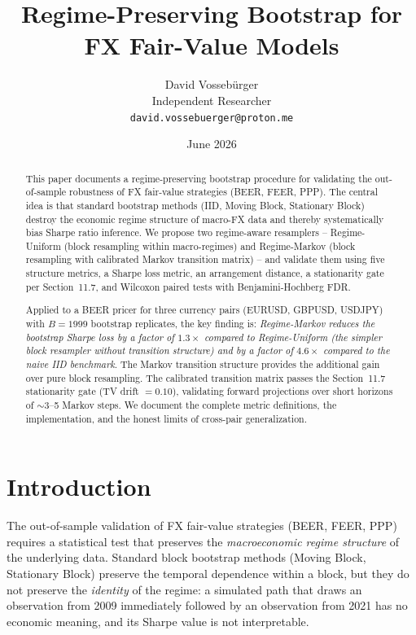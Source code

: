\documentclass[11pt,a4paper]{article}
\title{\textbf{Regime-Preserving Bootstrap for\\FX Fair-Value Models}}
\author{David Vossebürger\\
\small Independent Researcher\\
\small \texttt{david.vossebuerger@proton.me}}
\date{June 2026}
\theoremstyle{definition}
\begin{document}
\maketitle

\begin{abstract}
\noindent
This paper documents a regime-preserving bootstrap procedure for validating the out-of-sample robustness of FX fair-value strategies (BEER, FEER, PPP). The central idea is that standard bootstrap methods (IID, Moving Block, Stationary Block) destroy the economic regime structure of macro-FX data and thereby systematically bias Sharpe ratio inference. We propose two regime-aware resamplers -- Regime-Uniform (block resampling within macro-regimes) and Regime-Markov (block resampling with calibrated Markov transition matrix) -- and validate them using five structure metrics, a Sharpe loss metric, an arrangement distance, a stationarity gate per Section~11.7, and Wilcoxon paired tests with Benjamini-Hochberg FDR.

Applied to a BEER pricer for three currency pairs (EURUSD, GBPUSD, USDJPY) with $B = 1999$ bootstrap replicates, the key finding is: \emph{Regime-Markov reduces the bootstrap Sharpe loss by a factor of $1.3\times$ compared to Regime-Uniform (the simpler block resampler without transition structure) and by a factor of $4.6\times$ compared to the naive IID benchmark}. The Markov transition structure provides the additional gain over pure block resampling. The calibrated transition matrix passes the Section~11.7 stationarity gate (TV drift $= 0.10$), validating forward projections over short horizons of $\sim$3--5 Markov steps. We document the complete metric definitions, the implementation, and the honest limits of cross-pair generalization.
\end{abstract}

\tableofcontents
\newpage

\section{Introduction}

The out-of-sample validation of FX fair-value strategies (BEER, FEER, PPP) requires a statistical test that preserves the \emph{macroeconomic regime structure} of the underlying data. Standard block bootstrap methods (Moving Block, Stationary Block) preserve the temporal dependence within a block, but they do not preserve the \emph{identity} of the regime: a simulated path that draws an observation from 2009 immediately followed by an observation from 2021 has no economic meaning, and its Sharpe value is not interpretable.
\end{document}
